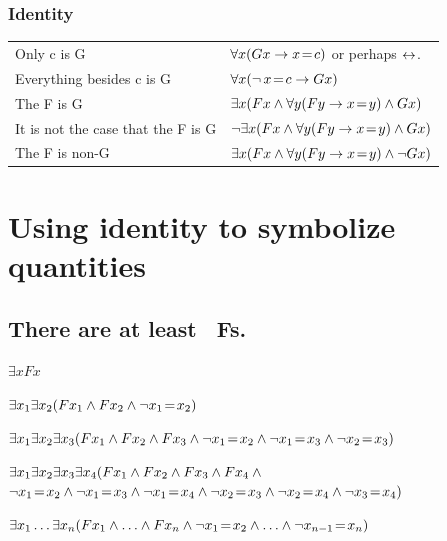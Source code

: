 \subsubsection*{Identity}
\begin{center}
\begin{tabular*}{\textwidth}{ll}
Only c is G & $\forall x(Gx \rightarrow x\!=\! c)$ or perhaps $\leftrightarrow$.  \\
Everything besides c is G & $\forall x(\neg \,x \!=\!  c \rightarrow Gx)$\\
The F is G & $\exists x(Fx \mathbin{\wedge} \forall y(Fy \rightarrow x\!=\! y) \mathbin{\wedge} Gx)$\\
It is not the case that the F is G & $\neg\exists x(Fx \mathbin{\wedge} \forall y(Fy \rightarrow x\!=\! y) \mathbin{\wedge} Gx)$\\
The F is non-G & $\exists x(Fx \mathbin{\wedge} \forall y(Fy \rightarrow x\!=\! y) \mathbin{\wedge} \neg Gx)$
\end{tabular*}
\end{center}







\section{Using identity to symbolize quantities}

\subsection*{There are at least \blank\ Fs.}
\label{summary:atleast}

\begin{ekey}
\item[\text{one}] $\exists xFx$
\item[\text{two}] $\exists x_1\exists x_2(Fx_1 \mathbin{\wedge} Fx_2 \mathbin{\wedge} \neg x_1  \!=\!  x_2)$
\item[\text{three}] $\exists x_1\exists x_2\exists x_3(Fx_1 \mathbin{\wedge} Fx_2 \mathbin{\wedge} Fx_3 \mathbin{\wedge} \neg x_1 \!=\!  x_2 \mathbin{\wedge}\neg x_1 \!=\!  x_3 \mathbin{\wedge} \neg x_2 \!=\!  x_3)$
\item[\text{four}] $\exists x_1\exists x_2\exists x_3\exists x_4 (Fx_1 \mathbin{\wedge} Fx_2 \mathbin{\wedge} Fx_3 \mathbin{\wedge} Fx_4 \mathbin{\wedge} \phantom{x}$\\
\phantom{$\exists x_1\exists x_2$}$\enot x_1 \eid  x_2 \eand \enot x_1 \eid  x_3 \eand \enot x_1 \eid  x_4 \eand \enot x_2 \eid  x_3 \eand \enot x_2 \eid  x_4 \eand \enot x_3 \eid  x_4)$
\item[n] $\exists x_1\ldots\exists x_n(Fx_1 \mathbin{\wedge}\ldots\mathbin{\wedge} Fx_n \mathbin{\wedge} \neg x_1 \!=\!  x_2 \mathbin{\wedge}\ldots\mathbin{\wedge} \neg x_{n-1} \!=\!  x_n)$ 
\end{ekey}

